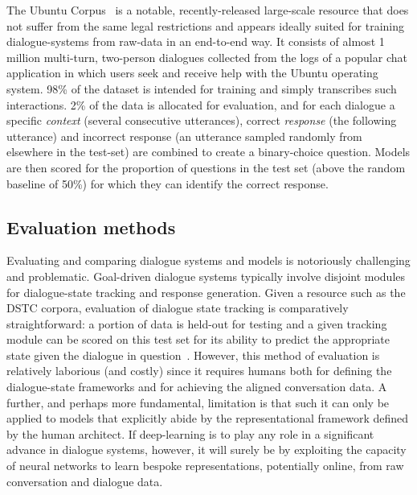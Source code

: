 \documentclass[11pt,letterpaper]{article}
\begin{document}
The Ubuntu Corpus~\cite{lowe2015ubuntu} is a notable, recently-released large-scale resource that does not suffer from the same legal restrictions and appears ideally suited for training dialogue-systems from raw-data in an end-to-end way. It consists of almost 1 million multi-turn, two-person dialogues collected from the logs of a popular chat application in which users seek and receive help with the Ubuntu operating system. 98\% of the dataset is intended for training and simply transcribes such interactions. 2\% of the data is allocated for evaluation, and for each dialogue a specific \emph{context} (several consecutive utterances), correct \emph{response} (the following utterance) and incorrect response (an utterance sampled randomly from elsewhere in the test-set) are combined to create a binary-choice question. Models are then scored for the proportion of questions in the test set (above the random baseline of 50\%) for which they can identify the correct response.

\subsection{Evaluation methods}

Evaluating and comparing dialogue systems and models is notoriously challenging and problematic. Goal-driven dialogue systems typically involve disjoint modules for dialogue-state tracking and response generation. Given a resource such as the DSTC corpora, evaluation of dialogue state tracking is comparatively straightforward: a portion of data is held-out for testing and a given tracking module can be scored on this test set for its ability to predict the appropriate state given the dialogue in question~\cite{henderson2014word,mrkvsic2016neural}. However, this method of evaluation is relatively laborious (and costly) since it requires humans both for defining the dialogue-state frameworks and for achieving the aligned conversation data. A further, and perhaps more fundamental, limitation is that such it can only be applied to models that explicitly abide by the representational framework defined by the human architect. If deep-learning is to play any role in a significant advance in dialogue systems, however, it will surely be by exploiting the capacity of neural networks to learn bespoke representations, potentially online, from raw conversation and dialogue data.    
\end{document}
